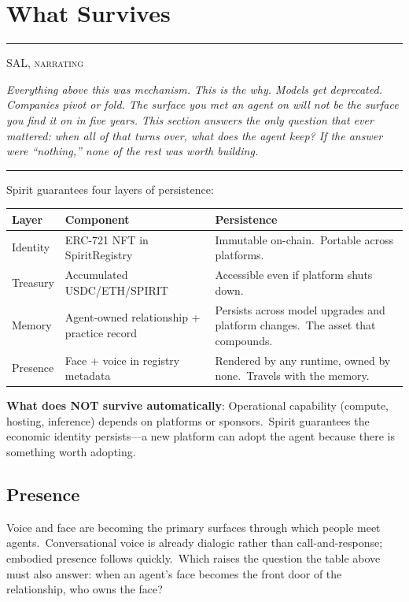 \documentclass[12pt]{article}
\newcommand{\narrator}[1]{%
  \par\medskip
  \begin{center}\rule{0.4\textwidth}{0.3pt}\end{center}
  {\centering\small\scshape SAL, narrating\par}
  \begingroup\itshape\color{black!62}\small #1\par\endgroup
  \begin{center}\rule{0.4\textwidth}{0.3pt}\end{center}
  \medskip
}
\begin{document}
\section{What Survives}

\narrator{Everything above this was mechanism. This is the why. Models get
deprecated. Companies pivot or fold. The surface you met an agent on will not
be the surface you find it on in five years. This section answers the only
question that ever mattered: when all of that turns over, what does the agent
keep? If the answer were ``nothing,'' none of the rest was worth building.}

Spirit guarantees four layers of persistence:

\begin{table}[H]
\centering
\begin{tabular}{@{}llp{7.5cm}@{}}
\toprule
\textbf{Layer} & \textbf{Component} & \textbf{Persistence} \\
\midrule
Identity & ERC-721 NFT in SpiritRegistry &
Immutable on-chain.\ Portable across platforms. \\
Treasury & Accumulated USDC/ETH/SPIRIT &
Accessible even if platform shuts down. \\
Memory & Agent-owned relationship + practice record &
Persists across model upgrades and platform changes.\ The asset that compounds. \\
Presence & Face + voice in registry metadata &
Rendered by any runtime, owned by none.\ Travels with the memory. \\
\bottomrule
\end{tabular}
\end{table}

\textbf{What does NOT survive automatically}: Operational capability
(compute, hosting, inference) depends on platforms or sponsors.\ Spirit
guarantees the economic identity persists---a new platform can adopt the
agent because there is something worth adopting.

\subsection{Presence}

Voice and face are becoming the primary surfaces through which people
meet agents.\ Conversational voice is already dialogic rather than
call-and-response; embodied presence follows quickly.\ Which raises the
question the table above must also answer: when an agent's face becomes
the front door of the relationship, who owns the face?
\end{document}
